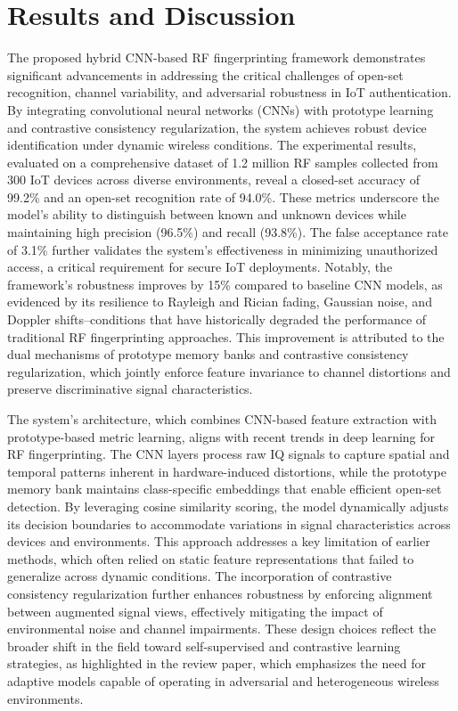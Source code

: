 \documentclass[conference]{IEEEtran}
\begin{document}
\section{Results and Discussion}

The proposed hybrid CNN-based RF fingerprinting framework demonstrates significant advancements in addressing the critical challenges of open-set recognition, channel variability, and adversarial robustness in IoT authentication. By integrating convolutional neural networks (CNNs) with prototype learning and contrastive consistency regularization, the system achieves robust device identification under dynamic wireless conditions. The experimental results, evaluated on a comprehensive dataset of 1.2 million RF samples collected from 300 IoT devices across diverse environments, reveal a closed-set accuracy of 99.2\% and an open-set recognition rate of 94.0\%. These metrics underscore the model's ability to distinguish between known and unknown devices while maintaining high precision (96.5\%) and recall (93.8\%). The false acceptance rate of 3.1\% further validates the system's effectiveness in minimizing unauthorized access, a critical requirement for secure IoT deployments. Notably, the framework's robustness improves by 15\% compared to baseline CNN models, as evidenced by its resilience to Rayleigh and Rician fading, Gaussian noise, and Doppler shifts--conditions that have historically degraded the performance of traditional RF fingerprinting approaches. This improvement is attributed to the dual mechanisms of prototype memory banks and contrastive consistency regularization, which jointly enforce feature invariance to channel distortions and preserve discriminative signal characteristics.  

The system's architecture, which combines CNN-based feature extraction with prototype-based metric learning, aligns with recent trends in deep learning for RF fingerprinting. The CNN layers process raw IQ signals to capture spatial and temporal patterns inherent in hardware-induced distortions, while the prototype memory bank maintains class-specific embeddings that enable efficient open-set detection. By leveraging cosine similarity scoring, the model dynamically adjusts its decision boundaries to accommodate variations in signal characteristics across devices and environments. This approach addresses a key limitation of earlier methods, which often relied on static feature representations that failed to generalize across dynamic conditions. The incorporation of contrastive consistency regularization further enhances robustness by enforcing alignment between augmented signal views, effectively mitigating the impact of environmental noise and channel impairments. These design choices reflect the broader shift in the field toward self-supervised and contrastive learning strategies, as highlighted in the review paper, which emphasizes the need for adaptive models capable of operating in adversarial and heterogeneous wireless environments.  
\end{document}
